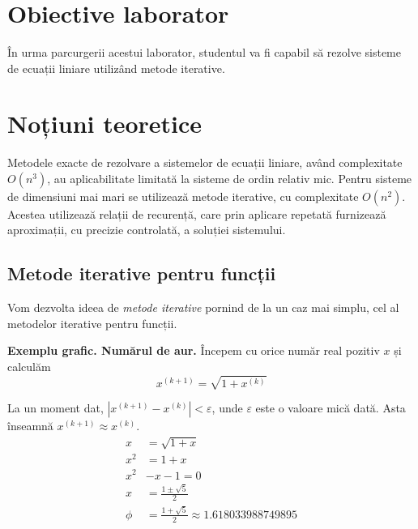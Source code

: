 \documentclass{exam}
\title{
	\textmd{\textbf{\MNLabTitle}}
	\author{}
	\date{}
}
\begin{document}
\begin{coverpages}
	\maketitle
	\thispagestyle{empty}
	\tableofcontents
\end{coverpages}

\section{Obiective laborator}

În urma parcurgerii acestui laborator, studentul va fi capabil să rezolve
sisteme de ecuații liniare utilizând metode iterative.

\section{Noțiuni teoretice}

Metodele exacte de rezolvare a sistemelor de ecuații liniare, având complexitate
$O(n^3)$, au aplicabilitate limitată la sisteme de ordin relativ mic. Pentru
sisteme de dimensiuni mai mari se utilizează metode iterative, cu complexitate
$O(n^2)$. Acestea utilizează relații de recurență, care prin aplicare repetată
furnizează aproximații, cu precizie controlată, a soluției sistemului.

\subsection{Metode iterative pentru funcții}

Vom dezvolta ideea de \textit{metode iterative} pornind de la un caz mai simplu,
cel al metodelor iterative pentru funcții.

\textbf{Exemplu grafic. Numărul de aur.} Începem cu orice număr real pozitiv $x$
și calculăm
\begin{equation*}
	x^{(k+1)} = \sqrt{1 + x^{(k)}}
\end{equation*}

La un moment dat, $|x^{(k+1)} - x^{(k)}| < \varepsilon$, unde $\varepsilon$ este
o valoare mică dată. Asta înseamnă $x^{(k+1)} \approx x^{(k)}$.
\begin{align*}
	x    & = \sqrt{1 + x}                                     \\
	x^2  & = 1 + x                                            \\
	x^2  & - x - 1 = 0                                        \\
	x    & = \frac{1 \pm \sqrt{5}}{2}                         \\
	\phi & = \frac{1 + \sqrt{5}}{2} \approx 1.618033988749895
\end{align*}
\end{document}
